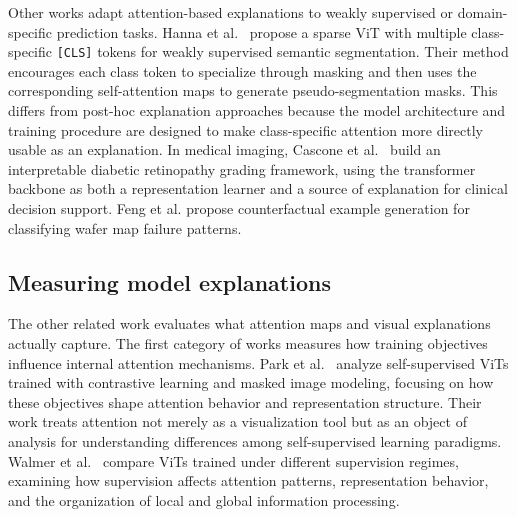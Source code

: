 \documentclass[lineno,pdflatex,sn-mathphys-num]{sn-jnl}%
\theoremstyle{thmstyleone}%
\theoremstyle{thmstyletwo}%
\theoremstyle{thmstylethree}%
\begin{document}
Other works adapt attention-based explanations to weakly supervised or domain-specific prediction tasks. Hanna et al.~\cite{Hanna25ICCV} propose a sparse ViT with multiple class-specific \texttt{[CLS]} tokens for weakly supervised semantic segmentation. Their method encourages each class token to specialize through masking and then uses the corresponding self-attention maps to generate pseudo-segmentation masks. This differs from post-hoc explanation approaches because the model architecture and training procedure are designed to make class-specific attention more directly usable as an explanation. In medical imaging, Cascone et al.~\cite{Cascone25ICCV} build an interpretable diabetic retinopathy grading framework, using the transformer backbone as both a representation learner and a source of explanation for clinical decision support. Feng et al. \cite{Feng2025AI} propose counterfactual example generation for classifying wafer map failure patterns.


\subsection{Measuring model explanations}

The other related work evaluates what attention maps and visual explanations actually capture. The first category of works measures how training objectives influence internal attention mechanisms. Park et al.~\cite{park2023what} analyze self-supervised ViTs trained with contrastive learning and masked image modeling, focusing on how these objectives shape attention behavior and representation structure. Their work treats attention not merely as a visualization tool but as an object of analysis for understanding differences among self-supervised learning paradigms. Walmer et al.~\cite{Walmer23CVPR} compare ViTs trained under different supervision regimes, examining how supervision affects attention patterns, representation behavior, and the organization of local and global information processing. 
\end{document}
